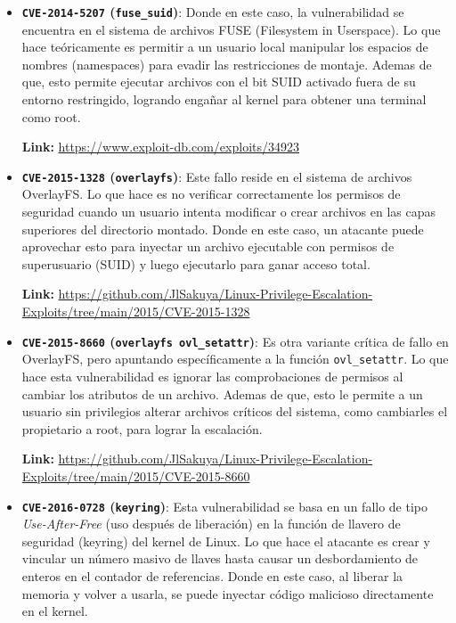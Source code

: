 \documentclass[letterpaper,11pt]{article}
\begin{document}
\begin{itemize}
  \item \textbf{\texttt{CVE-2014-5207} (\texttt{fuse\_suid})}: Donde en este caso, la vulnerabilidad se encuentra en el sistema de archivos FUSE (Filesystem in Userspace). Lo que hace teóricamente es permitir a un usuario local manipular los espacios de nombres (namespaces) para evadir las restricciones de montaje. Ademas de que, esto permite ejecutar archivos con el bit SUID activado fuera de su entorno restringido, logrando engañar al kernel para obtener una terminal como root.
  
  \textbf{Link:} \url{https://www.exploit-db.com/exploits/34923}

  \item \textbf{\texttt{CVE-2015-1328} (\texttt{overlayfs})}: Este fallo reside en el sistema de archivos OverlayFS. Lo que hace es no verificar correctamente los permisos de seguridad cuando un usuario intenta modificar o crear archivos en las capas superiores del directorio montado. Donde en este caso, un atacante puede aprovechar esto para inyectar un archivo ejecutable con permisos de superusuario (SUID) y luego ejecutarlo para ganar acceso total.
  
  \textbf{Link:} \url{https://github.com/JlSakuya/Linux-Privilege-Escalation-Exploits/tree/main/2015/CVE-2015-1328}

  \item \textbf{\texttt{CVE-2015-8660} (\texttt{overlayfs ovl\_setattr})}: Es otra variante crítica de fallo en OverlayFS, pero apuntando específicamente a la función \texttt{ovl\_setattr}. Lo que hace esta vulnerabilidad es ignorar las comprobaciones de permisos al cambiar los atributos de un archivo. Ademas de que, esto le permite a un usuario sin privilegios alterar archivos críticos del sistema, como cambiarles el propietario a root, para lograr la escalación.

  \textbf{Link:} \url{https://github.com/JlSakuya/Linux-Privilege-Escalation-Exploits/tree/main/2015/CVE-2015-8660}

  \item \textbf{\texttt{CVE-2016-0728} (\texttt{keyring})}: Esta vulnerabilidad se basa en un fallo de tipo \textit{Use-After-Free} (uso después de liberación) en la función de llavero de seguridad (keyring) del kernel de Linux. Lo que hace el atacante es crear y vincular un número masivo de llaves hasta causar un desbordamiento de enteros en el contador de referencias. Donde en este caso, al liberar la memoria y volver a usarla, se puede inyectar código malicioso directamente en el kernel.


\end{itemize}
\end{document}
